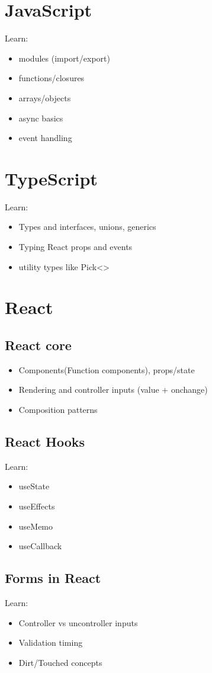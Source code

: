 \documentclass[11pt]{article}
\begin{document}
\section{JavaScript}
\label{sec:org1a9a312}
Learn:
\begin{itemize}
\item modules (import/export)
\item functions/closures
\item arrays/objects
\item async basics
\item event handling
\end{itemize}
\section{TypeScript}
\label{sec:orgb8664b2}
Learn:
\begin{itemize}
\item Types and interfaces, unions, generics
\item Typing React props and events
\item utility types like Pick<>
\end{itemize}
\section{React}
\label{sec:org67d0f44}
\subsection{React core}
\label{sec:org55d297e}
\begin{itemize}
\item Components(Function components), props/state
\item Rendering and controller inputs (value + onchange)
\item Composition patterns
\end{itemize}
\subsection{React Hooks}
\label{sec:org160a4a9}
Learn:
\begin{itemize}
\item useState
\item useEffects
\item useMemo
\item useCallback
\end{itemize}
\subsection{Forms in React}
\label{sec:orgaa64b2e}
Learn:
\begin{itemize}
\item Controller vs uncontroller inputs
\item Validation timing
\item Dirt/Touched concepts
\end{itemize}
\end{document}
